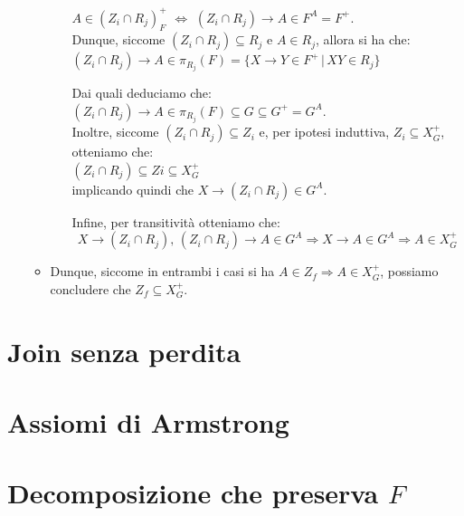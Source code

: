 \documentclass{article}
\begin{document}
\begin{itemize}
\begin{itemize}
\begin{itemize}
      $A \in (Z_i \cap R_j)^+_F$ $\Leftrightarrow$ $(Z_i \cap R_j) \rightarrow A \in F^A = F^+$. \\
      
      Dunque, siccome $(Z_i \cap R_j) \subseteq R_j$ e $A \in R_j$, allora si ha che:\\

        $(Z_i \cap R_j) \rightarrow A \in \pi_{R_j}(F) = \{X \rightarrow Y \in F^+ \,|\, XY \in R_j\}$
      
      
    Dai quali deduciamo che:\\

    $(Z_i \cap R_j) \rightarrow A \in \pi_{R_j}(F) \subseteq G \subseteq G^+ = G^A$.\\

    Inoltre, siccome $(Z_i \cap R_j) \subseteq Z_i$ e, per ipotesi induttiva, $Z_i \subseteq X_G^+$, otteniamo che:\\ 
    
    $(Z_i \cap R_j) \subseteq Zi \subseteq X_G^+$ \\
    
    implicando quindi che $X \rightarrow (Z_i \cap R_j) \in G^A$.

    Infine, per transitività otteniamo che:
    \[ X \rightarrow (Z_i \cap R_j), \, (Z_i \cap R_j) \rightarrow A \in G^A \Rightarrow X \rightarrow A \in G^A \Rightarrow A \in X_G^+ \]
    \end{itemize}  
    \item Dunque, siccome in entrambi i casi si ha $A \in Z_f \Rightarrow A \in X_G^+$, possiamo concludere che $Z_f \subseteq X_G^+$.

  \end{itemize}
\end{itemize}
\pagebreak


\section{Join senza perdita}













\pagebreak
\section{Assiomi di Armstrong}
\pagebreak
\section{Decomposizione che preserva $F$}
\end{document}
